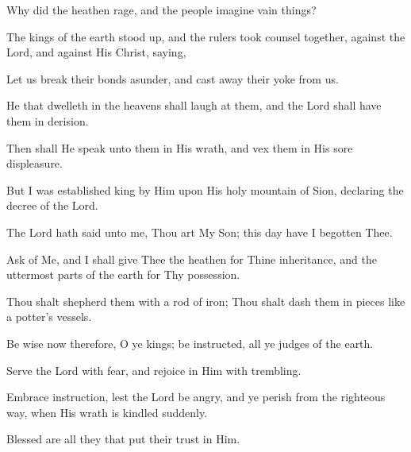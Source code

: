 Why did the heathen rage, and the people imagine vain things?

The kings of the earth stood up, and the rulers took counsel together, against the Lord, and against His Christ, saying,

Let us break their bonds asunder, and cast away their yoke from us.

He that dwelleth in the heavens shall laugh at them, and the Lord shall have them in derision.

Then shall He speak unto them in His wrath, and vex them in His sore displeasure.

But I was established king by Him upon His holy mountain of Sion, declaring the decree of the Lord.

The Lord hath said unto me, Thou art My Son; this day have I begotten Thee.

Ask of Me, and I shall give Thee the heathen for Thine inheritance, and the uttermost parts of the earth for Thy possession.

Thou shalt shepherd them with a rod of iron; Thou shalt dash them in pieces like a potter's vessels.

Be wise now therefore, O ye kings; be instructed, all ye judges of the earth.

Serve the Lord with fear, and rejoice in Him with trembling.

Embrace instruction, lest the Lord be angry, and ye perish from the righteous way, when His wrath is kindled suddenly.

Blessed are all they that put their trust in Him.

